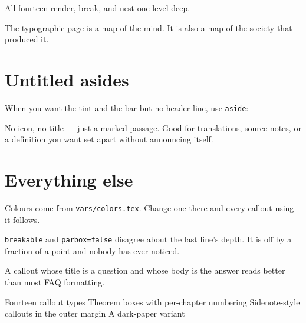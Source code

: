 \begin{success}
All fourteen render, break, and nest one level deep.
\end{success}

\begin{quotebox}[Bringhurst]
The typographic page is a map of the mind. It is also a map of the society
that produced it.
\end{quotebox}

\section{Untitled asides}

When you want the tint and the bar but no header line, use \texttt{aside}:

\begin{aside}[teal]
No icon, no title — just a marked passage. Good for translations, source
notes, or a definition you want set apart without announcing itself.
\end{aside}

\section{Everything else}

\begin{abstract}
This chapter demonstrates callouts. That is all it does.
\end{abstract}

\begin{info}
Colours come from \texttt{vars/colors.tex}. Change one there and every callout
using it follows.
\end{info}

\begin{bug}[Known]
\texttt{breakable} and \texttt{parbox=false} disagree about the last line's
depth. It is off by a fraction of a point and nobody has ever noticed.
\end{bug}

\begin{idea}
A callout whose title is a question and whose body is the answer reads better
than most FAQ formatting.
\end{idea}

\begin{todo}
\begin{tasks}
  \task[done] Fourteen callout types
  \task[done] Theorem boxes with per-chapter numbering
  \task Sidenote-style callouts in the outer margin
  \task A dark-paper variant
\end{tasks}
\end{todo}

